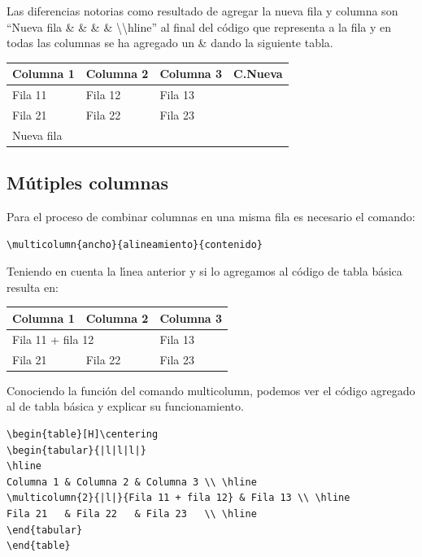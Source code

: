 \documentclass[letterpaper, 10pt, journal]{IEEEtran}
\begin{document}
Las diferencias notorias como resultado de agregar la nueva fila y columna son \textquotedblleft{}Nueva fila \& \& \& \& \textbackslash{}\textbackslash{}hline\textquotedblright{} al final del c\'{o}digo que representa a la fila y en todas las columnas se ha agregado un \& dando la siguiente tabla.

\begin{table}[H]\centering
\begin{tabular}{|l|l|l|l|}
\hline
Columna 1  & Columna 2 & Columna 3 & C.Nueva \\ \hline
Fila 11    & Fila 12   & Fila 13   & \\ \hline
Fila 21    & Fila 22   & Fila 23   & \\ \hline
Nueva fila &           &           & \\ \hline
\end{tabular}
\end{table}

\subsection{M\'utiples columnas}
Para el proceso de combinar columnas en una misma fila es necesario el comando:

\lstset{language=Java}
\begin{lstlisting}
\multicolumn{ancho}{alineamiento}{contenido}
\end{lstlisting}

Teniendo en cuenta la l\'{\i}nea anterior y si lo agregamos al c\'{o}digo de tabla b\'{a}sica resulta en:

\begin{table}[H]\centering
\begin{tabular}{|l|l|l|}
\hline
Columna 1 & Columna 2  & Columna 3 \\ \hline
\multicolumn{2}{|l|}{Fila 11 + fila 12} & Fila 13 \\ \hline
Fila 21   & Fila 22    & Fila 23   \\ \hline
\end{tabular}
\end{table}

Conociendo la funci\'{o}n del comando multicolumn, podemos ver el c\'{o}digo agregado al de tabla b\'{a}sica y explicar su funcionamiento.

\lstset{language=Java}
\begin{lstlisting}
\begin{table}[H]\centering
\begin{tabular}{|l|l|l|}
\hline
Columna 1 & Columna 2 & Columna 3 \\ \hline
\multicolumn{2}{|l|}{Fila 11 + fila 12} & Fila 13 \\ \hline
Fila 21   & Fila 22   & Fila 23   \\ \hline
\end{tabular}
\end{table}
\end{lstlisting}
\end{document}
